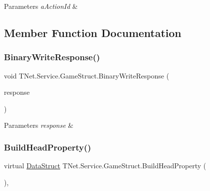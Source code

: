 \begin{DoxyParams}{Parameters}
{\em a\+Action\+Id} & \\
\hline
\end{DoxyParams}


\subsection{Member Function Documentation}
\mbox{\label{class_t_net_1_1_service_1_1_game_struct_a1eaba10db782e5f64762c903f65d1dfa}} 
\subsubsection{\texorpdfstring{Binary\+Write\+Response()}{BinaryWriteResponse()}}
{\footnotesize\ttfamily void T\+Net.\+Service.\+Game\+Struct.\+Binary\+Write\+Response (\begin{DoxyParamCaption}\item[{\mbox{\hyperlink{class_t_net_1_1_service_1_1_base_game_response}{Base\+Game\+Response}}}]{response }\end{DoxyParamCaption})\hspace{0.3cm}{\ttfamily [protected]}}






\begin{DoxyParams}{Parameters}
{\em response} & \\
\hline
\end{DoxyParams}
\mbox{\label{class_t_net_1_1_service_1_1_game_struct_ab270ca4b2b5bc29167ec5ee17b5dcb96}} 
\subsubsection{\texorpdfstring{Build\+Head\+Property()}{BuildHeadProperty()}}
{\footnotesize\ttfamily virtual \mbox{\hyperlink{class_t_net_1_1_service_1_1_data_struct}{Data\+Struct}} T\+Net.\+Service.\+Game\+Struct.\+Build\+Head\+Property (\begin{DoxyParamCaption}{ }\end{DoxyParamCaption})\hspace{0.3cm}{\ttfamily [protected]}, {\ttfamily [virtual]}}





